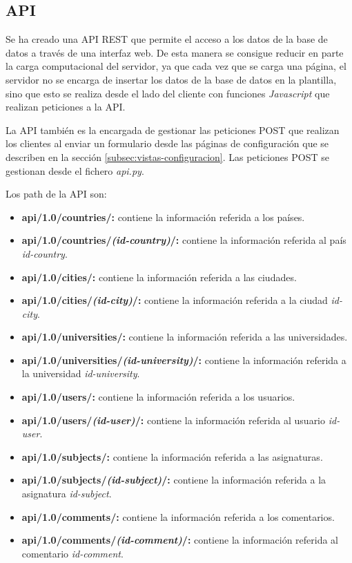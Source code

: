 \documentclass[a4paper, 12pt]{book}
\begin{document}
\subsection{API} 
\label{subsec:api}

Se ha creado una API REST que permite el acceso a los datos de la base de datos a través de una interfaz web. De esta manera se consigue reducir en parte la carga computacional del servidor, ya que cada vez que se carga una página, el servidor no se encarga de insertar los datos de la base de datos en la plantilla, sino que esto se realiza desde el lado del cliente con funciones \textit{Javascript} que realizan peticiones a la API. 
\newline

La API también es la encargada de gestionar las peticiones POST que realizan los clientes al enviar un formulario desde las páginas de configuración que se describen en la sección \ref{subsec:vistas-configuracion}. Las peticiones POST se gestionan desde el fichero \textit{api.py}.
\newline

Los path de la API son:

\begin{itemize}
        \item \textbf{api/1.0/countries/:} contiene la información referida a los países.
        \item \textbf{api/1.0/countries/\textit{(id-country)}/:} contiene la información referida al país \textit{id-country}.
        \item \textbf{api/1.0/cities/:} contiene la información referida a las ciudades.
        \item \textbf{api/1.0/cities/\textit{(id-city)}/:} contiene la información referida a la ciudad \textit{id-city}.
        \item \textbf{api/1.0/universities/:} contiene la información referida a las universidades.
        \item \textbf{api/1.0/universities/\textit{(id-university)}/:} contiene la información referida a la universidad \textit{id-university}.
        \item \textbf{api/1.0/users/:} contiene la información referida a los usuarios.
        \item \textbf{api/1.0/users/\textit{(id-user)}/:} contiene la información referida al usuario \textit{id-user}.
        \item \textbf{api/1.0/subjects/:} contiene  la información referida a las asignaturas.
        \item \textbf{api/1.0/subjects/\textit{(id-subject)}/:} contiene  la información referida a la asignatura \textit{id-subject}.
        \item \textbf{api/1.0/comments/:} contiene  la información referida a los comentarios.
        \item \textbf{api/1.0/comments/\textit{(id-comment)}/:} contiene  la información referida al comentario \textit{id-comment}.
\end{itemize}
\end{document}
